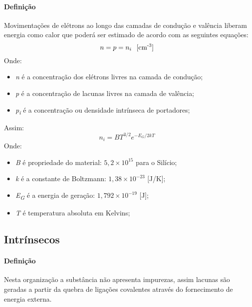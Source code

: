 \documentclass{article}
\begin{document}
            \paragraph{Definição}Movimentações de elétrons ao longo das camadas de condução e valência liberam energia como calor que poderá ser estimado de acordo com as seguintes equações:
                \[
                    n = p = n_{i} \hspace{2.5mm} \text{[cm\textsuperscript{-3}]}
                \]
            Onde:
                \begin{itemize}[noitemsep]
                    \item \textit{n} é a concentração dos elétrons livres na camada de condução;
                    \item \textit{p} é a concentração de lacunas livres na camada de valência;
                    \item \textit{p\textsubscript{i}} é a concentração ou densidade intrínseca de portadores;
                \end{itemize}
            Assim:
                \begin{equation}
                    \boxed{
                        n_{i} = B T^{3/2} e^{-E_{G}/2kT}
                    }\label{eq:8}
                \end{equation}
            Onde:
                \begin{itemize}[noitemsep]
                    \item \textit{B} é propriedade do material: $5,2 \times 10^{15}$ para o Silício;
                    \item \textit{k} é a constante de Boltzmann: $1,38 \times 10^{-23}$ [J/K];
                    \item \textit{E\textsubscript{G}} é a energia de geração: $1,792 \times 10^{-19}$ [J];
                    \item \textit{T} é temperatura absoluta em Kelvins;
                \end{itemize}

        \subsection{Intrínsecos}
            \paragraph{Definição}Nesta organização a substância não apresenta impurezas, assim lacunas são geradas a partir da quebra de ligações covalentes através do fornecimento de energia externa.
\end{document}
